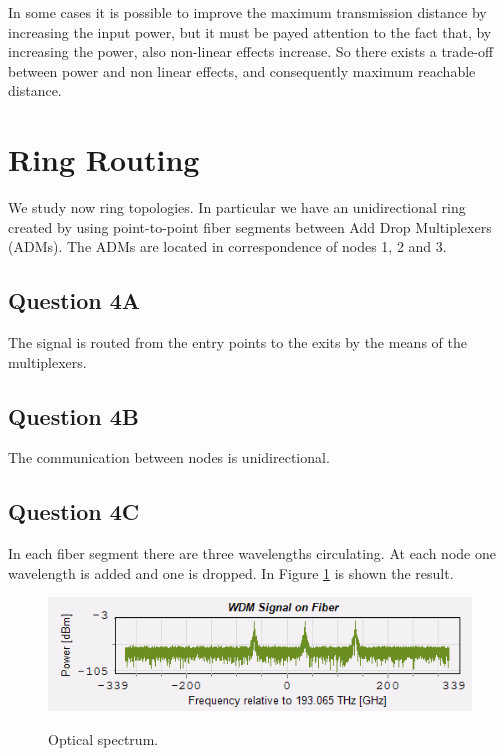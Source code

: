 \documentclass[a4paper,10pt]{report}
\begin{document}
In some cases it is possible to improve the maximum transmission distance by increasing the input power,
but it must be payed attention to the fact that, by increasing the power, also non-linear effects increase.
So there exists a trade-off between power and non linear effects, and consequently maximum
reachable distance.



\section*{Ring Routing}

We study now ring topologies. In particular we have an unidirectional ring created by using
point-to-point fiber segments between Add Drop Multiplexers (ADMs).
The ADMs are located in correspondence of nodes 1, 2 and 3.

\subsection*{Question 4A}
The signal is routed from the entry points to the exits by the means of the multiplexers.

\subsection*{Question 4B}
The communication between nodes is unidirectional.

\subsection*{Question 4C}
In each fiber segment there are three wavelengths circulating. At each node one wavelength is
added and one is dropped. In Figure \ref{qc} is shown the result.

\begin{figure}[!ht]
   \centering
   \includegraphics[width=12cm]{qc.png}\\
   \caption{Optical spectrum.}
   \label{qc}
\end{figure}
\end{document}
